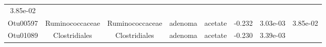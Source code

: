 \documentclass[11pt,]{article}
\begin{document}
\begin{longtable}[]{@{}cccccccc@{}}
\begin{minipage}[t]{0.08\columnwidth}
3.85e-02\strut
\end{minipage}\tabularnewline
\begin{minipage}[t]{0.08\columnwidth}\centering\strut
Otu00597\strut
\end{minipage} & \begin{minipage}[t]{0.15\columnwidth}\centering\strut
Ruminococcaceae\strut
\end{minipage} & \begin{minipage}[t]{0.15\columnwidth}\centering\strut
Ruminococcaceae\strut
\end{minipage} & \begin{minipage}[t]{0.08\columnwidth}\centering\strut
adenoma\strut
\end{minipage} & \begin{minipage}[t]{0.09\columnwidth}\centering\strut
acetate\strut
\end{minipage} & \begin{minipage}[t]{0.07\columnwidth}\centering\strut
-0.232\strut
\end{minipage} & \begin{minipage}[t]{0.08\columnwidth}\centering\strut
3.03e-03\strut
\end{minipage} & \begin{minipage}[t]{0.08\columnwidth}\centering\strut
3.85e-02\strut
\end{minipage}\tabularnewline
\begin{minipage}[t]{0.08\columnwidth}\centering\strut
Otu01089\strut
\end{minipage} & \begin{minipage}[t]{0.15\columnwidth}\centering\strut
Clostridiales\strut
\end{minipage} & \begin{minipage}[t]{0.15\columnwidth}\centering\strut
Clostridiales\strut
\end{minipage} & \begin{minipage}[t]{0.08\columnwidth}\centering\strut
adenoma\strut
\end{minipage} & \begin{minipage}[t]{0.09\columnwidth}\centering\strut
acetate\strut
\end{minipage} & \begin{minipage}[t]{0.07\columnwidth}\centering\strut
-0.230\strut
\end{minipage} & \begin{minipage}[t]{0.08\columnwidth}\centering\strut
3.39e-03\strut
\end{minipage} & \begin{minipage}[t]{0.08\columnwidth}\centering\strut

\end{minipage}
\end{longtable}
\end{document}
